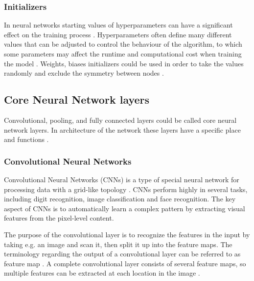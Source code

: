 \subsubsection{Initializers}
In neural networks starting values of hyperparameters can have a significant effect on the training process \citep{Bengio2012}. Hyperparameters often define many different values that can be adjusted to control the behaviour of the algorithm, to which some parameters may affect the runtime and computational cost when training the model \citep{Goodfellow2016}. Weights, biases initializers could be used in order to take the values randomly and exclude the symmetry between nodes \citep{Gustafson1998}. 

\subsection{Core Neural Network layers}\label{sec:Layers}
Convolutional, pooling, and fully connected layers could be called core neural network layers. In architecture of the network these layers have a specific place and functions \citep{LeCun2015,Goodfellow2016}.

\subsubsection{Convolutional Neural Networks}
Convolutional Neural Networks (CNNs) is a type of special neural network for processing data with a grid-like topology \citep{Goodfellow2016}. CNNs perform highly in several tasks, including digit recognition, image classification and face recognition. The key aspect of CNNs is to automatically learn a complex pattern by extracting visual features from the pixel-level content.\citep{Acquarelli2017,LeCun1998}

\noindent
The purpose of the convolutional layer is to recognize the features in the input by taking e.g. an image and scan it, then split it up into the feature maps. The terminology regarding the output of a convolutional layer can be referred to as feature map \citep{Goodfellow2016,LeCun1998}. A complete convolutional layer consists of several feature maps, so multiple features can be extracted at each location in the image \citep{LeCun1998}. 



